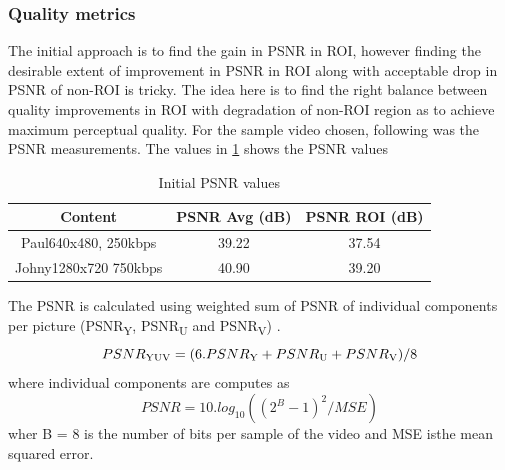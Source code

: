 \documentclass[11pt]{article} %
\begin{document}
\subsubsection{Quality metrics}
The initial approach is to find the gain in PSNR in ROI, however finding the desirable extent of improvement in PSNR in ROI along with acceptable drop in PSNR of non-ROI is tricky. The idea here is to find the right balance between quality improvements in ROI with degradation of non-ROI region as to achieve maximum perceptual quality. For the sample video chosen, following was the PSNR measurements. The values in \ref{InitPSNR1} shows the PSNR values 
\begin{table} [h!]
\centering
\begin{tabular}{ |c|c|c| }
 \hline
Content & PSNR Avg (dB) & PSNR ROI (dB) \\
 \hline 
 Paul640x480, 250kbps & 39.22 & 37.54 \\ 
 Johny1280x720 750kbps & 40.90 & 39.20 \\  
 \hline
\end{tabular}
 \caption{Initial PSNR values}
 \label{InitPSNR1}
\end{table}
The PSNR is calculated using weighted sum of PSNR of individual components per picture (PSNR\textsubscript{Y}, PSNR\textsubscript{U} and PSNR\textsubscript{V}) \cite{ComparingCodingEfficiency}.
\begin{equation}
\label{Eq:PSNR}
PSNR\textsubscript{YUV} = ( 6 . PSNR\textsubscript{Y} + PSNR\textsubscript{U} + PSNR\textsubscript{V}) / 8
\end{equation}
 where individual components are computes as
\begin{equation}
\label{Eq:PSNRDef}
PSNR = 10 . log_{10}((2^B - 1)^2 / MSE)
\end{equation}
wher B = 8 is the number of bits per sample of the video and MSE isthe mean squared error.
\end{document}
